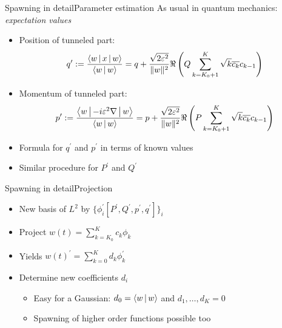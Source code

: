 \documentclass{beamer}
\begin{document}
\begin{frame}{Spawning in detail}{Parameter estimation}
  As usual in quantum mechanics: \emph{expectation values}
  \begin{itemize}
    \item Position of tunneled part:
    \begin{equation*}
      q^\prime := \frac{\Braket{w|x|w}}{\Braket{w|w}} = q + \frac{\sqrt{2\varepsilon^2}}{\|w\|^2} \Re \left(Q \sum_{k=K_0+1}^K \sqrt{k} \overline{c_k} c_{k-1} \right)
    \end{equation*}
    \item Momentum of tunneled part:
    \begin{equation*}
      p^\prime := \frac{\Braket{w|-i\varepsilon^2 \nabla|w}}{\Braket{w|w}} = p + \frac{\sqrt{2\varepsilon^2}}{\|w\|^2} \Re \left(P \sum_{k=K_0+1}^K \sqrt{k} \overline{c_k} c_{k-1} \right)
    \end{equation*}
    \item Formula for $q^\prime$ and $p^\prime$ in terms of known values
    \item Similar procedure for $P^\prime$ and $Q^\prime$
  \end{itemize}
\end{frame}


\begin{frame}{Spawning in detail}{Projection}
  \begin{itemize}
    \item New basis of $L^2$ by $\{\phi_i^\prime\left[P^\prime, Q^\prime, p^\prime, q^\prime\right]\}_i$
  \end{itemize}
  \begin{itemize}
    \item Project $w(t) = \sum_{k=K_0}^{K} c_k \phi_k$
    \item Yields $w(t)^\prime = \sum_{k=0}^{K} d_k \phi_k^\prime$
  \end{itemize}
  \begin{itemize}
    \item Determine new coefficients $d_i$
    \begin{itemize}
      \item Easy for a Gaussian: $d_0 = \Braket{w|w}$ and $d_1, \ldots, d_K = 0$
      \item Spawning of higher order functions possible too
    \end{itemize}
  \end{itemize}
\end{frame}
\end{document}
